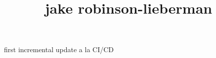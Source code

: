 \documentclass[11pt, oneside]{article}
\title{jake robinson-lieberman}
\begin{document}
\maketitle

first incremental update a la CI/CD
\end{document}
